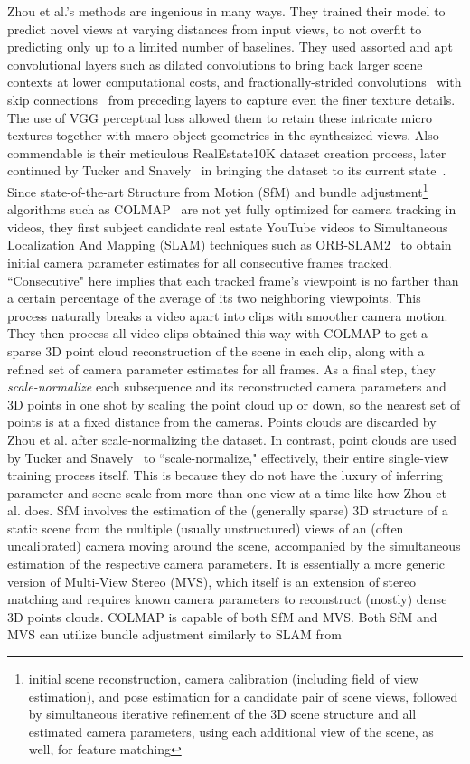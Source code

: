 Zhou et al.'s methods are ingenious in many ways. They trained their model to predict novel views at varying distances from input views, to not overfit to predicting only up to a limited number of baselines. They used assorted and apt convolutional layers such as dilated convolutions to bring back larger scene contexts at lower computational costs, and fractionally-strided convolutions~\cite{prove_introduction_2018} with skip connections~\cite{adaloglou_intuitive_2020} from preceding layers to capture even the finer texture details. The use of VGG perceptual loss allowed them to retain these intricate micro textures together with macro object geometries in the synthesized views. Also commendable is their meticulous RealEstate10K dataset creation process, later continued by Tucker and Snavely~\cite{single_view_mpi} in bringing the dataset to its current state~\cite{zhou2018stereo}. Since state-of-the-art Structure from Motion (SfM) and bundle adjustment\footnote{initial scene reconstruction, camera calibration (including field of view estimation), and pose estimation for a candidate pair of scene views, followed by simultaneous iterative refinement of the 3D scene structure and all estimated camera parameters, using each additional view of the scene, as well, for feature matching} algorithms such as COLMAP~\cite{schoenberger2016sfm,schoenberger2016mvs} are not yet fully optimized for camera tracking in videos, they first subject candidate real estate YouTube videos to Simultaneous Localization And Mapping (SLAM) techniques such as ORB-SLAM2~\cite{mur-artal_orb-slam_2015} to obtain initial camera parameter estimates for all consecutive frames tracked. ``Consecutive" here implies that each tracked frame's viewpoint is no farther than a certain percentage of the average of its two neighboring viewpoints. This process naturally breaks a video apart into clips with smoother camera motion. They then process all video clips obtained this way with COLMAP to get a sparse 3D point cloud reconstruction of the scene in each clip, along with a refined set of camera parameter estimates for all frames. As a final step, they \textit{scale-normalize} each subsequence and its reconstructed camera parameters and 3D points in one shot by scaling the point cloud up or down, so the nearest set of points is at a fixed distance from the cameras. Points clouds are discarded by Zhou et al. after scale-normalizing the dataset. In contrast, point clouds are used by Tucker and Snavely~\cite{single_view_mpi} to ``scale-normalize," effectively, their entire single-view training process itself. This is because they do not have the luxury of inferring parameter and scene scale from more than one view at a time like how Zhou et al. does. SfM involves the estimation of the (generally sparse) 3D structure of a static scene from the multiple (usually unstructured) views of an (often uncalibrated) camera moving around the scene, accompanied by the simultaneous estimation of the respective camera parameters. It is essentially a more generic version of Multi-View Stereo (MVS), which itself is an extension of stereo matching and requires known camera parameters to reconstruct (mostly) dense 3D points clouds. COLMAP is capable of both SfM and MVS. Both SfM and MVS can utilize bundle adjustment similarly to SLAM from 